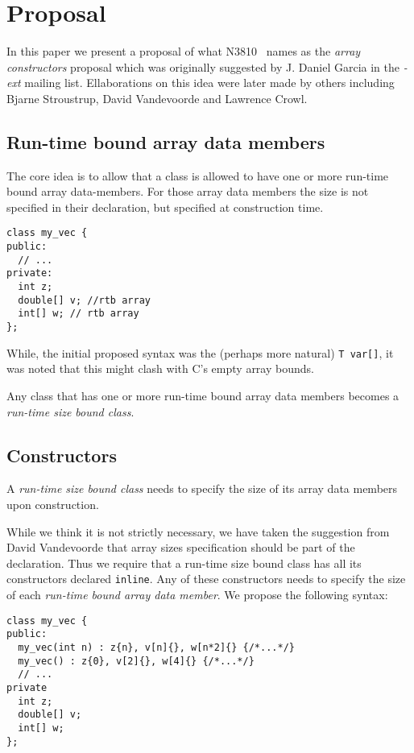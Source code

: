 \section{Proposal}

In this paper we present a proposal of what N3810~\cite{n3810} names as the
\emph{array constructors} proposal which was originally suggested by J. Daniel
Garcia in the \emph{-ext} mailing list. Ellaborations on this idea were later
made by others including Bjarne Stroustrup, David Vandevoorde and Lawrence
Crowl.

\subsection{Run-time bound array data members}

The core idea is to allow that a class is allowed to have one or more run-time
bound array data-members. For those array data members the size is not specified in their
declaration, but specified at construction time.

\begin{lstlisting}
class my_vec {
public:
  // ...
private:
  int z;
  double[] v; //rtb array
  int[] w; // rtb array
};
\end{lstlisting}

While, the initial proposed syntax was the (perhaps more natural) 
\verb+T var[]+, it was noted that this might clash with C's empty array bounds.

Any class that has one or more run-time bound array data members becomes a
\emph{run-time size bound class}.

\subsection{Constructors}

A \emph{run-time size bound class} needs to specify the size of its array data
members upon construction.

While we think it is not strictly necessary, we have taken the suggestion from
David Vandevoorde that array sizes specification should be part of the
declaration. Thus we require that a run-time size bound class has all its
constructors declared \verb+inline+. Any of these constructors needs  to specify
the size of each \emph{run-time bound array data member}. We propose the
following syntax:

\begin{lstlisting}
class my_vec {
public:
  my_vec(int n) : z{n}, v[n]{}, w[n*2]{} {/*...*/}
  my_vec() : z{0}, v[2]{}, w[4]{} {/*...*/}
  // ...
private
  int z;
  double[] v;
  int[] w;
};
\end{lstlisting}

